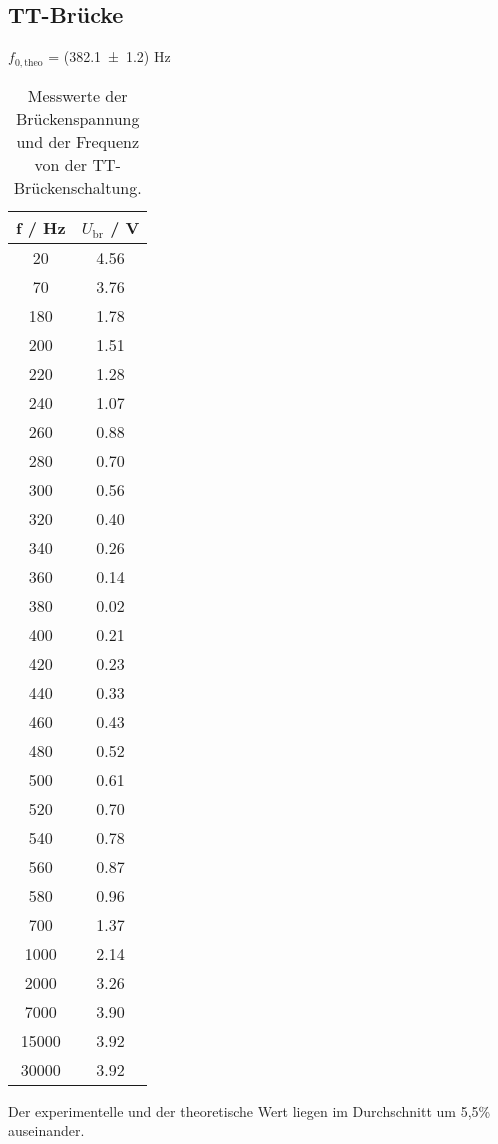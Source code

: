 \subsection{TT-Brücke}

$f_{0,\text{theo}}$ = (\num{382.1 +- 1.2}) Hz

\begin{table}[H]
  \centering
  \begin{tabular}{c c}
    \toprule
    f / Hz & $U_\text{br}$ / V \\
    \midrule
      20	  &  4.56  \\
      70	  &  3.76  \\
      180	  &  1.78  \\
      200	  &  1.51  \\
      220	  &  1.28  \\
      240	  &  1.07  \\
      260	  &  0.88  \\
      280	  &  0.70  \\
      300	  &  0.56  \\
      320	  &  0.40  \\
      340	  &  0.26  \\
      360	  &  0.14  \\
      380	  &  0.02  \\
      400	  &  0.21  \\
      420	  &  0.23  \\
      440	  &  0.33  \\
      460	  &  0.43  \\
      480	  &  0.52  \\
      500	  &  0.61  \\
      520	  &  0.70  \\
      540	  &  0.78  \\
      560	  &  0.87  \\
      580	  &  0.96  \\
      700	  &  1.37  \\
      1000	&  2.14  \\
      2000	&  3.26  \\
      7000	&  3.90  \\
      15000	&  3.92  \\
      30000	&  3.92  \\
  \end{tabular}
  \caption{Messwerte der Brückenspannung und der Frequenz von der TT-Brückenschaltung.}
  \label{tab:TT-Brücke}
\end{table}

Der experimentelle und der theoretische Wert liegen im Durchschnitt um 5,5\% auseinander.
